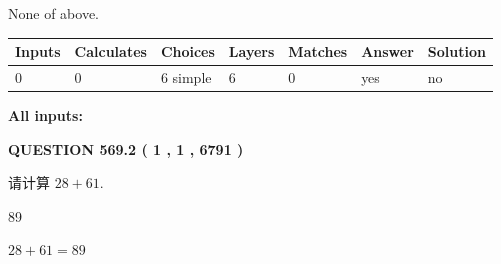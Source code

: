 \documentclass{ctexart}
\begin{document}
 
 None of above.
 
 
\noindent{}
 
 
   
   
   
   
\noindent\begin{tabular}{|l|l|l|l|l|l|l|}
 \hline
Inputs & Calculates & Choices & Layers & Matches & Answer & Solution \\ \hline
 0  & 
 0  & 
 6
  simple  
  & 
 6  & 
 0  & 
  yes & 
  no 
  \\ \hline
 \end{tabular}
   
   
   
   
\noindent{}
   
   
   
   
\noindent\vspace{0.1in}\hspace{-0.08in} {\textbf{\Large{All inputs: }}}
   
   
  
\vspace{0.2in}
  
{\textbf{\Large{QUESTION
569.2 
 ( 1 , 1 , 6791 )
}}}
  
  
 
请计算 $ %
28 +  %
61 $.
 
 
 
\noindent{}
 
 

89
 
 
\noindent{}
 
 

 
 
 
\noindent{}
 
 

$ %
28 +  %
61=   %
89$
 
 
\noindent{}
 
 

 
   
   
   
\end{document}
